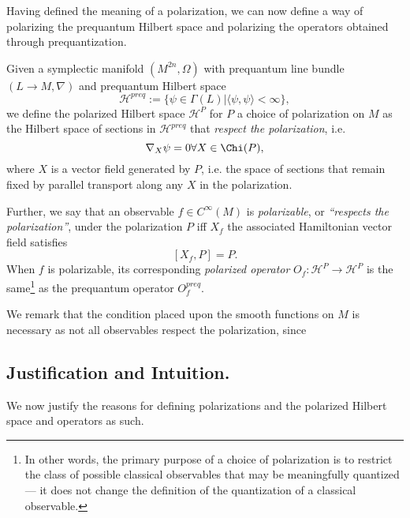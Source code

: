 Having defined the meaning of a polarization, we can now define a way of polarizing the prequantum Hilbert space and polarizing the operators obtained through prequantization.
\begin{defn}
Given a symplectic manifold $(M^{2n},\Omega)$ with prequantum line bundle $(L \to M,\nabla)$ and prequantum Hilbert space 
$$
\mathcal{H}^{preq} := \{\psi \in \Gamma(L) | \langle\psi,\psi\rangle < \infty \},	%
$$
we define the polarized Hilbert space $\mathcal{H}^{P}$ for $P$ a choice of polarization on $M$ as the Hilbert space of sections in $\mathcal{H}^{preq}$ that \emph{respect the polarization}, i.e.
$$
\nabla_X \psi = 0 \forall X \in \Chi(P),
$$
where $X$ is a vector field generated by $P$, i.e. the space of sections that remain fixed by parallel transport along any $X$ in the polarization. %

Further, we say that an observable $f \in C^\infty(M)$ is \emph{polarizable}, or \emph{``respects the polarization''}, under the polarization $P$ iff $X_f$ the associated Hamiltonian vector field satisfies
$$
[X_f,P] = P.
$$
When $f$ is polarizable, its corresponding \emph{polarized operator} $O_f: \mathcal{H}^{P} \to \mathcal{H}^{P}$ is the same\footnote{In other words, the primary purpose of a choice of polarization is to restrict the class of possible classical observables that may be meaningfully quantized --- it does not change the definition of the quantization of a classical observable.}
 as the prequantum operator $O^{preq}_f$.

\end{defn}

We remark that the condition placed upon the smooth functions on $M$ is necessary as not all observables respect the polarization, since %


\subsection{Justification and Intuition.}
We now justify the reasons for defining polarizations and the polarized Hilbert space and operators as such.

